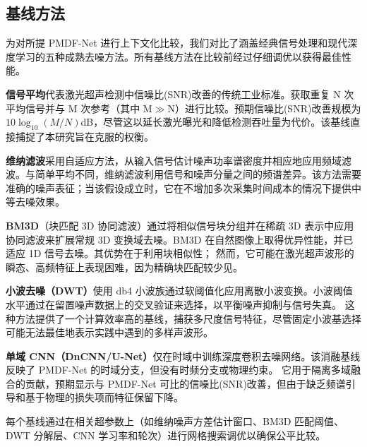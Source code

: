 \subsection{基线方法}
\label{sec:baselines}

为对所提 PMDF-Net 进行上下文化比较，我们对比了涵盖经典信号处理和现代深度学习的五种成熟去噪方法。所有基线方法在比较前经过仔细调优以获得最佳性能。

\textbf{信号平均}代表激光超声检测中信噪比(SNR)改善的传统工业标准。获取重复 N 次平均信号并与 M 次参考（其中 M$\gg$N）进行比较。预期信噪比(SNR)改善规模为$10\log_{10}(M/N)$dB，尽管这以延长激光曝光和降低检测吞吐量为代价。该基线直接捕捉了本研究旨在克服的权衡。

\textbf{维纳滤波}采用自适应方法，从输入信号估计噪声功率谱密度并相应地应用频域滤波\cite{dabov2007bm3d}。与简单平均不同，维纳滤波利用信号和噪声分量之间的频谱差异。该方法需要准确的噪声表征；当该假设成立时，它在不增加多次采集时间成本的情况下提供中等去噪效果。

\textbf{BM3D}（块匹配 3D 协同滤波）通过将相似信号块分组并在稀疏 3D 表示中应用协同滤波来扩展常规 3D 变换域去噪\cite{dabov2007bm3d}。BM3D 在自然图像上取得优异性能，并已适应 1D 信号去噪。其优势在于利用块相似性；
然而，它可能在激光超声波形的瞬态、高频特征上表现困难，因为精确块匹配较少见。

\textbf{小波去噪（DWT）}使用 db4 小波族通过软阈值化应用离散小波变换\cite{chen2019wavelet}。小波阈值水平通过在留置噪声数据上的交叉验证来选择，以平衡噪声抑制与信号失真。
这种方法提供了一个计算效率高的基线，捕获多尺度信号特征，尽管固定小波基选择可能无法最佳地表示实践中遇到的多样声波形。

\textbf{单域 CNN（DnCNN/U-Net）}仅在时域中训练深度卷积去噪网络\cite{zhang2017denoising}。该消融基线反映了 PMDF-Net 的时域分支，但没有时频分支或物理约束。
它用于隔离多域融合的贡献，预期显示与 PMDF-Net 可比的信噪比(SNR)改善，但由于缺乏频谱引导和基于物理的损失项而特征保留下降。

每个基线通过在相关超参数上（如维纳噪声方差估计窗口、BM3D 匹配阈值、DWT 分解层、CNN 学习率和轮次）进行网格搜索调优以确保公平比较。